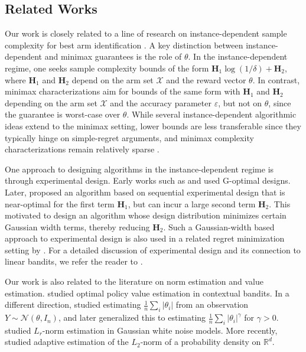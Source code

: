 \subsection{Related Works}
Our work is closely related to a line of research on instance-dependent sample complexity for best arm identification \citep{soare2014best,karnin2016verification,xu2018fully,tao2018best,fiez2019sequential,jedra2020optimal,katz2020empirical,degenne2020gamification}. A key distinction between instance-dependent and minimax guarantees is the role of $\theta$. In the instance-dependent regime, one seeks sample complexity bounds of the form $\mathbf{H}_1\log(1/\delta)+\mathbf{H}_2$, where $\mathbf{H}_1$ and $\mathbf{H}_2$ depend on the arm set $\mathcal{X}$ and the reward vector $\theta$. In contrast, minimax characterizations aim for bounds of the same form with $\mathbf{H}_1$ and $\mathbf{H}_2$ depending on the arm set $\mathcal{X}$ and the accuracy parameter $\varepsilon$, but not on $\theta$, since the guarantee is worst-case over $\theta$. While several instance-dependent algorithmic ideas extend to the minimax setting, lower bounds are less transferable since they typically hinge on simple-regret arguments, and minimax complexity characterizations remain relatively sparse \citep{even2002pac,shamir2015complexity,chen2024assouad}.


One approach to designing algorithms in the instance-dependent regime is through experimental design. Early works such as \cite{soare2014best} and \cite{karnin2016verification} used G-optimal designs. Later, \cite{fiez2019sequential} proposed an algorithm based on sequential experimental design that is near-optimal for the first term $\mathbf{H}_1$, but can incur a large second term $\mathbf{H}_2$. This motivated \cite{katz2020empirical} to design an algorithm whose design distribution minimizes certain Gaussian width terms, thereby reducing $\mathbf{H}_2$. Such a Gaussian-width based approach to experimental design is also used in a related regret minimization setting by \cite{wagenmaker2021experimental}. For a detailed discussion of experimental design and its connection to linear bandits, we refer the reader to \cite{lattimore2020bandit}.

Our work is also related to the literature on norm estimation and value estimation. \cite{kong2020sublinear} studied optimal policy value estimation in contextual bandits. In a different direction, \cite{cai2011testing} studied estimating $\frac{1}{n}\sum_i |\theta_i|$ from an observation $Y\sim\mathcal{N}(\theta,I_n)$, and \cite{collier2020estimation} later generalized this to estimating $\frac{1}{n}\sum_i |\theta_i|^\gamma$ for $\gamma>0$. \cite{han2020estimation} studied $L_r$-norm estimation in Gaussian white noise models. More recently, \cite{cleanthous2025adaptive} studied adaptive estimation of the $L_2$-norm of a probability density on $\mathbb{R}^d$.

